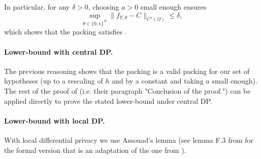 \documentclass{article}
\newcommand{\1}{\mathds{1}}
\theoremstyle{plain}
\theoremstyle{definition}
\theoremstyle{remark}
\begin{document}
In particular, for any $\delta>0$, choosing $a>0$ small enough ensures
\begin{equation}
    \sup_{\theta\in\{0,1\}^N}
\| f_{Y,\theta} - C \|_{C^{s}(\Omega)}
\leq \delta,
\end{equation}
which shows that the packing satisfies .

\paragraph{Lower-bound with central DP.}

The previous reasoning shows that the packing is a valid packing for our set of hypotheses (up to a rescaling of $h$ and by a constant and taking $a$ small enough). The rest of the proof of \cite{lalanne2025PrivateOTMaps} (i.e. their paragraph "Conclusion of the proof.") can be applied directly to prove the stated lower-bound under central DP.

\paragraph{Lower-bound with local DP.}

With local differential privacy we use Assouad's lemma (see lemma F.3 from \cite{lalanne2025PrivateOTMaps} for the formal version that is an adaptation of the one from \cite{acharya2021differentially}).
\end{document}

